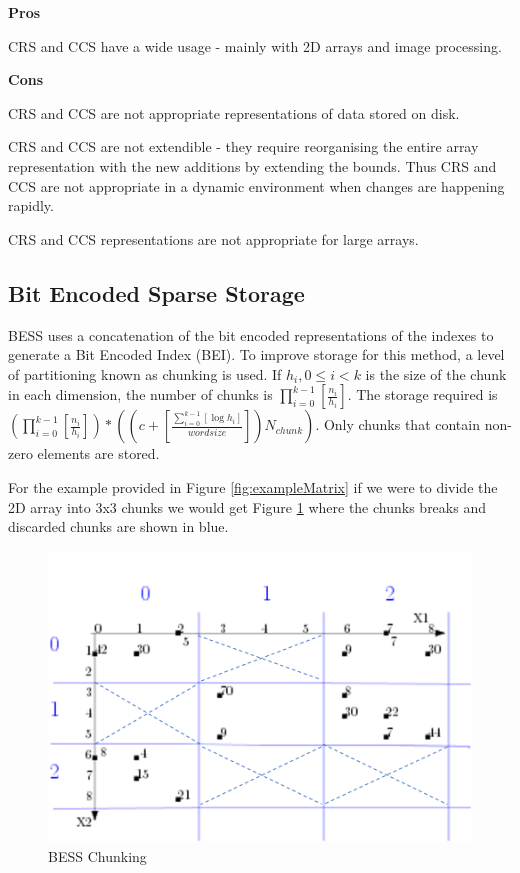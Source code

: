 \textbf{Pros}
\begin{compactitem}
	\item CRS and CCS have a wide usage - mainly with 2D arrays and image processing.
\end{compactitem}

\textbf{Cons}
\begin{compactitem}
	\item CRS and CCS are not appropriate representations of data stored on disk.
	\item CRS and CCS are not extendible - they require reorganising the entire array representation with the new additions by extending the bounds. Thus CRS and CCS are not appropriate in a dynamic environment when changes are happening rapidly.
	\item CRS and CCS representations are not appropriate for large arrays.
\end{compactitem}

\subsection{Bit Encoded Sparse Storage}
BESS uses a concatenation of the bit encoded representations of the indexes to generate a Bit Encoded Index (BEI). To improve storage for this method, a level of partitioning known as chunking is used. If $h_i, 0\leq i < k$ is the size of the chunk in each dimension, the number of chunks is $\prod_{i=0}^{k-1}[\frac{n_i}{h_i}]$. The storage required is $(\prod_{i=0}^{k-1}[\frac{n_i}{h_i}])*((c+ [\frac{\sum_{i=0}^{k-1}[\log h_i]}{wordsize}])N_{chunk})$. Only chunks that contain non-zero elements are stored.

For the example provided in Figure \ref{fig:exampleMatrix} if we were to divide the 2D array into 3x3 chunks we would get Figure \ref{fig:chunk} where the chunks breaks and discarded chunks are shown in blue.

 \begin{figure}[H]
	\centering
	\includegraphics[width=0.7\linewidth]{chunked}
	\caption{BESS Chunking}
	\label{fig:chunk}
\end{figure}

